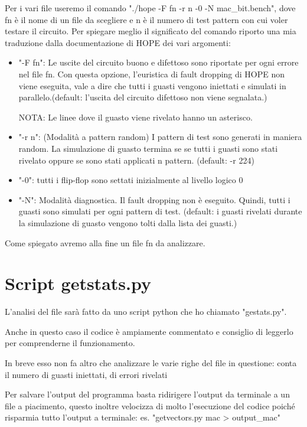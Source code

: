 \documentclass[12pt, letterpaper]{article}
\begin{document}
Per i vari file useremo il comando "./hope -F fn -r n -0 -N mac\_{bit}.bench", dove fn è il nome di un file da scegliere e n è il numero di test pattern con cui voler testare il circuito.
Per spiegare meglio il significato del comando riporto una mia traduzione dalla documentazione di HOPE dei vari argomenti:

\begin{itemize}
\item "-F fn": Le uscite del circuito buono e difettoso sono riportate per ogni errore nel file fn. Con questa opzione, l'euristica di fault dropping di HOPE non viene eseguita, vale a dire che tutti i guasti vengono iniettati e simulati in parallelo.(default: l'uscita del circuito difettoso non viene segnalata.) 

NOTA: Le linee dove il guasto viene rivelato hanno un asterisco.

\item "-r n": (Modalità a pattern random)
I pattern di test sono generati in maniera random. La simulazione di guasto termina se se tutti i guasti sono stati rivelato oppure se sono stati applicati n pattern. (default: -r 224)

\item "-0": tutti i flip-flop sono settati inizialmente al livello logico 0

\item "-N": Modalità diagnostica. Il fault dropping non è eseguito. Quindi, tutti i guasti sono simulati per ogni pattern di test. (default: i guasti rivelati durante la simulazione di guasto vengono tolti dalla lista dei guasti.)

\end{itemize}

Come spiegato avremo alla fine un file fn da analizzare.

\section{Script getstats.py}

L'analisi del file sarà fatto da uno script python che ho chiamato "gestats.py".

Anche in questo caso il codice è ampiamente commentato e consiglio di leggerlo per comprenderne il funzionamento. 

In breve esso non fa altro che analizzare le varie righe del file in questione: conta il numero di guasti iniettati, di errori rivelati

Per salvare l'output del programma basta ridirigere l'output da terminale a un file a piacimento, questo inoltre velocizza di molto l'esecuzione del codice poiché risparmia tutto l'output a terminale: es. "getvectors.py mac > output\_mac"
\end{document}
